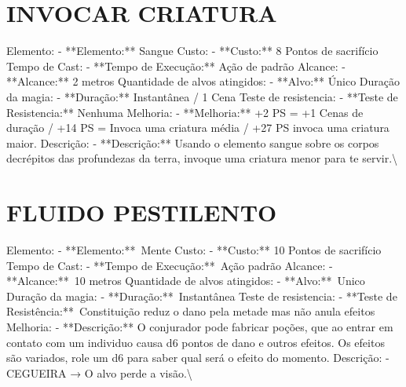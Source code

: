 \documentclass{article}%
\begin{document}
\section{INVOCAR CRIATURA}%
\label{sec:INVOCARCRIATURA}%
Elemento: {-} **Elemento:** Sangue\newline%
Custo: {-} **Custo:** 8 Pontos de sacrifício\newline%
Tempo de Cast: {-} **Tempo de Execução:** Ação de padrão\newline%
Alcance: {-} **Alcance:** 2 metros\newline%
Quantidade de alvos atingidos: {-} **Alvo:** Único\newline%
Duração da magia: {-} **Duração:** Instantânea / 1 Cena\newline%
Teste de resistencia: {-} **Teste de Resistencia:** Nenhuma\newline%
Melhoria: {-} **Melhoria:** +2 PS = +1 Cenas de duração / +14 PS = Invoca uma criatura média / +27 PS invoca uma criatura maior.\newline%
Descrição: {-} **Descrição:** Usando o elemento sangue sobre os corpos decrépitos das profundezas da terra, invoque uma criatura menor para te servir.\textbackslash{}

%
\section{FLUIDO PESTILENTO}%
\label{sec:FLUIDOPESTILENTO}%
Elemento: {-} **Elemento:**~Mente\newline%
Custo: {-} **Custo:** 10 Pontos de sacrifício\newline%
Tempo de Cast: {-} **Tempo de Execução:**~Ação padrão\newline%
Alcance: {-} **Alcance:**~10 metros\newline%
Quantidade de alvos atingidos: {-} **Alvo:**~Unico\newline%
Duração da magia: {-} **Duração:**~Instantânea\newline%
Teste de resistencia: {-} **Teste de Resistência:**~Constituição reduz o dano pela metade mas não anula efeitos\newline%
Melhoria: {-} **Descrição:** O conjurador pode fabricar poções, que ao entrar em contato com um individuo causa d6 pontos de dano e outros efeitos. Os efeitos são variados, role um d6 para saber qual será o efeito do momento.\newline%
Descrição:   {-} CEGUEIRA → O alvo perde a visão.\textbackslash{}
\end{document}
